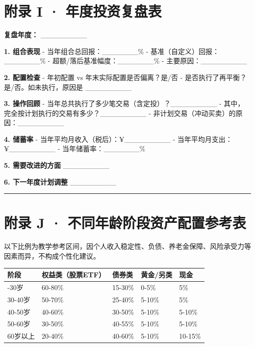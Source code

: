 \documentclass[a4paper,11pt,oneside,fontset=none,UTF8,zihao=-4]{ctexbook}
\begin{document}
\section{附录 I ·
年度投资复盘表}\label{ux9644ux5f55-i-ux5e74ux5ea6ux6295ux8d44ux590dux76d8ux8868}

\textbf{复盘年度：} \_\_\_\_\_\_\_\_\_

\textbf{1. 组合表现} - 当年组合总回报：\_\_\_\_\_\_\_\% -
基准（自定义）回报：\_\_\_\_\_\_\_\% -
超额/落后基准幅度：\_\_\_\_\_\_\_\% - 主要原因：\_\_\_\_\_\_\_\_\_

\textbf{2. 配置检查} - 年初配置 vs 年末实际配置是否偏离？是/否 -
是否执行了再平衡？是/否。如未执行，原因是 \_\_\_\_\_\_\_\_\_

\textbf{3. 操作回顾} -
当年总共执行了多少笔交易（含定投）？\_\_\_\_\_\_\_\_\_ -
其中，完全按计划执行的交易有多少？\_\_\_\_\_\_\_\_\_ -
非计划交易（冲动买卖）的原因：\_\_\_\_\_\_\_\_\_

\textbf{4. 储蓄率} - 当年平均月收入（税后）：¥\_\_\_\_\_\_\_\_\_ -
当年平均月支出：¥\_\_\_\_\_\_\_\_\_ - 当年储蓄率：\_\_\_\_\_\_\_\%

\textbf{5. 需要改进的方面} \_\_\_\_\_\_\_\_\_

\textbf{6. 下一年度计划调整} \_\_\_\_\_\_\_\_\_

\begin{center}{\color{dh-bronze}\rule{0.2\textwidth}{0.5pt}}\end{center}

\section{附录 J ·
不同年龄阶段资产配置参考表}\label{ux9644ux5f55-j-ux4e0dux540cux5e74ux9f84ux9636ux6bb5ux8d44ux4ea7ux914dux7f6eux53c2ux8003ux8868}

\begin{dhquote}
以下比例为教学参考区间，因个人收入稳定性、负债、养老金保障、风险承受力等因素而异，不构成个性化建议。
\end{dhquote}

\begin{longtable}[]{@{}lllll@{}}
\toprule\noalign{}\rowcolor{dh-pink!25}
阶段 & 权益类（股票ETF） & 债券类 & 黄金/另类 & 现金 \\
\midrule\noalign{}
\endhead
\bottomrule\noalign{}
\endlastfoot
20-30岁 & 60-80\% & 15-30\% & 0-5\% & 5\% \\
30-40岁 & 50-70\% & 25-40\% & 5-10\% & 5\% \\
40-50岁 & 40-60\% & 30-50\% & 5-10\% & 5-10\% \\
50-60岁 & 30-50\% & 40-55\% & 5-10\% & 5-10\% \\
60岁以上 & 20-40\% & 40-60\% & 5-10\% & 10-15\% \\
\end{longtable}
\end{document}
